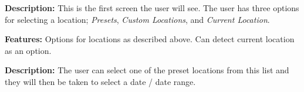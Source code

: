 \documentclass[11pt,english,numbers=endperiod,parskip=half]{scrartcl}
\begin{document}
\begin{figure}[H]
\end{figure}
\bigskip
\textbf{Description: }This is the first screen the user will see.
The user has three options for selecting a location;
\textit{Presets}, \textit{Custom Locations}, and \textit{Current Location}.

\textbf{Features: }Options for locations as described above. Can detect current
location as an option.

\begin{figure}[H]
\end{figure}
\bigskip
\textbf{Description: }The user can select one of the preset locations from this
list and they will then be taken to select a date / date range.
\end{document}
